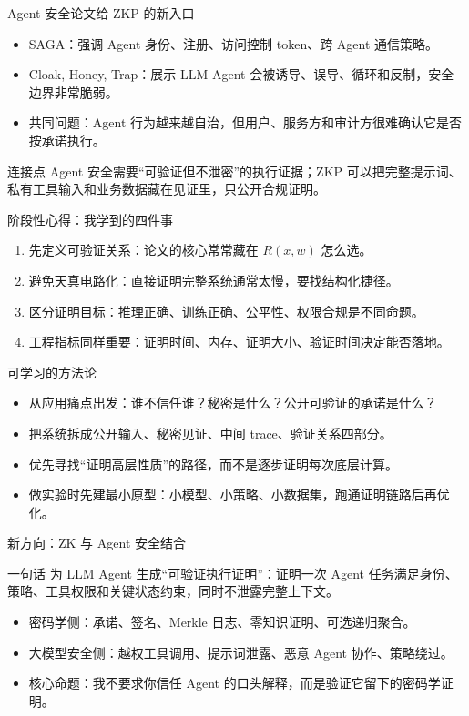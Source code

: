 \documentclass[aspectratio=169]{beamer}
\newcommand{\kw}[1]{\textcolor{uestc}{\heiti #1}}
\begin{document}
\begin{frame}{Agent 安全论文给 ZKP 的新入口}
  \begin{itemize}
    \item \kw{SAGA}：强调 Agent 身份、注册、访问控制 token、跨 Agent 通信策略。
    \item \kw{Cloak, Honey, Trap}：展示 LLM Agent 会被诱导、误导、循环和反制，安全边界非常脆弱。
    \item 共同问题：Agent 行为越来越自治，但用户、服务方和审计方很难确认它是否按承诺执行。
  \end{itemize}
  \vspace{0.4em}
  \begin{block}{连接点}
    Agent 安全需要“可验证但不泄密”的执行证据；ZKP 可以把完整提示词、私有工具输入和业务数据藏在见证里，只公开合规证明。
  \end{block}
\end{frame}

\begin{frame}{阶段性心得：我学到的四件事}
  \begin{enumerate}
    \item \kw{先定义可验证关系}：论文的核心常常藏在 $R(x,w)$ 怎么选。
    \item \kw{避免天真电路化}：直接证明完整系统通常太慢，要找结构化捷径。
    \item \kw{区分证明目标}：推理正确、训练正确、公平性、权限合规是不同命题。
    \item \kw{工程指标同样重要}：证明时间、内存、证明大小、验证时间决定能否落地。
  \end{enumerate}
\end{frame}

\begin{frame}{可学习的方法论}
  \begin{itemize}
    \item 从应用痛点出发：谁不信任谁？秘密是什么？公开可验证的承诺是什么？
    \item 把系统拆成公开输入、秘密见证、中间 trace、验证关系四部分。
    \item 优先寻找“证明高层性质”的路径，而不是逐步证明每次底层计算。
    \item 做实验时先建最小原型：小模型、小策略、小数据集，跑通证明链路后再优化。
  \end{itemize}
\end{frame}

\begin{frame}{新方向：ZK 与 Agent 安全结合}
  \begin{block}{一句话}
    为 LLM Agent 生成“可验证执行证明”：证明一次 Agent 任务满足身份、策略、工具权限和关键状态约束，同时不泄露完整上下文。
  \end{block}
  \begin{itemize}
    \item \kw{密码学侧}：承诺、签名、Merkle 日志、零知识证明、可选递归聚合。
    \item \kw{大模型安全侧}：越权工具调用、提示词泄露、恶意 Agent 协作、策略绕过。
    \item \kw{核心命题}：我不要求你信任 Agent 的口头解释，而是验证它留下的密码学证明。
  \end{itemize}
\end{frame}
\end{document}
